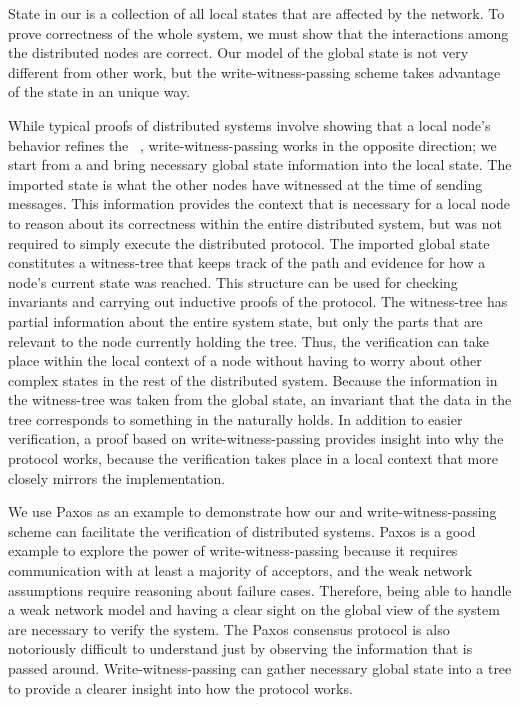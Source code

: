 State in our \globalstate{} is a collection of all local states that are affected by the network.
To prove correctness of the whole system, we must show that the interactions among the distributed nodes are correct.
Our model of the global state is not very different from other work, but the write-witness-passing scheme takes advantage of the state in an unique way.

While typical proofs of distributed systems involve showing that a local node's behavior refines the \globalstate{}~\cite{verdi, ironfleet},
write-witness-passing works in the opposite direction;
we start from a \globalstate{} and bring necessary global state information into the local state.
The imported state is what the other nodes have witnessed at the time of sending messages.
This information provides the context that is necessary for a local node to reason about its correctness within the entire distributed system,
but was not required to simply execute the distributed protocol.
The imported global state constitutes a witness-tree that keeps track of the path and evidence for how a node's current state was reached.
This structure can be used for checking invariants and carrying out inductive proofs of the protocol.
The witness-tree has partial information about the entire system state, but only the parts that are relevant to the node currently holding the tree.
Thus, the verification can take place within the local context of a node without having to worry about other complex states in the rest of the distributed system.
Because the information in the witness-tree was taken from the global state, an invariant that the data in the tree corresponds to something in the \globalstate{} naturally holds.
In addition to easier verification, a proof based on write-witness-passing provides insight into why the protocol works,
because the verification takes place in a local context that more closely mirrors the implementation.

We use Paxos as an example to demonstrate how our \globalstate{} and write-witness-passing scheme can facilitate the verification of distributed systems.
Paxos is a good example to explore the power of write-witness-passing because it requires communication with at least a majority of acceptors,
and the weak network assumptions require reasoning about failure cases.
Therefore, being able to handle a weak network model and having a clear sight on the global view of the system are necessary to verify the system.
The Paxos consensus protocol is also notoriously difficult to understand just by observing the information that is passed around.
Write-witness-passing can gather necessary global state into a tree to provide a clearer insight into how the protocol works.

